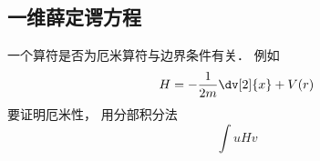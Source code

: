 
\subsection{一维薛定谔方程}
一个算符是否为厄米算符与边界条件有关． 例如
\begin{equation}
H = -\frac{1}{2m}\dv[2]{x} + V(r)
\end{equation}
要证明厄米性， 用分部积分法
\begin{equation}
\int uHv
\end{equation}

